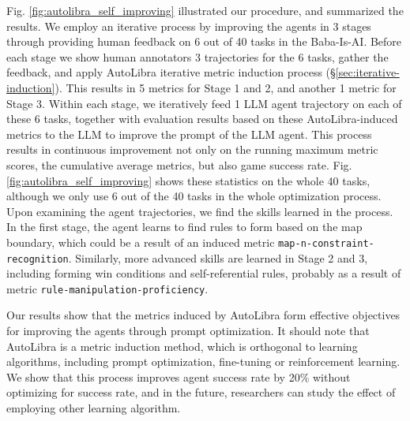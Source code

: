 Fig. \ref{fig:autolibra_self_improving} illustrated our procedure, and summarized the results. 
We employ an iterative process by improving the agents in 3 stages through providing human feedback on 6 out of 40 tasks in the Baba-Is-AI. Before each stage we show human annotators 3 trajectories for the 6 tasks, gather the feedback, and apply AutoLibra iterative metric induction process (\S\ref{sec:iterative-induction}). This results in 5 metrics for Stage 1 and 2, and another 1 metric for Stage 3. 
Within each stage, we iteratively feed 1 LLM agent trajectory on each of these 6 tasks, together with evaluation results based on these AutoLibra-induced metrics to the LLM to improve the prompt of the LLM agent. 
This process results in continuous improvement not only on the running maximum metric scores, the cumulative average metrics, but also game success rate. Fig. \ref{fig:autolibra_self_improving} shows these statistics on the whole 40 tasks, although we only use 6 out of the 40 tasks in the whole optimization process. 
Upon examining the agent trajectories, we find the 
skills learned in the process. In the first stage, the agent learns to find rules to form based on the map boundary, which could be a result of an induced metric \texttt{map-n-constraint-recognition}.
Similarly, more advanced skills are learned in Stage 2 and 3, including forming win conditions and self-referential rules, probably as a result of metric \texttt{rule-manipulation-proficiency}.

Our results show that the metrics induced by AutoLibra form effective objectives for improving the agents through prompt optimization. It should note that AutoLibra is a metric induction method, which is orthogonal to learning algorithms, including prompt optimization, fine-tuning or reinforcement learning. We show that this process improves agent success rate by 20\% without optimizing for success rate, and in the future, researchers can study the effect of employing other learning algorithm. 